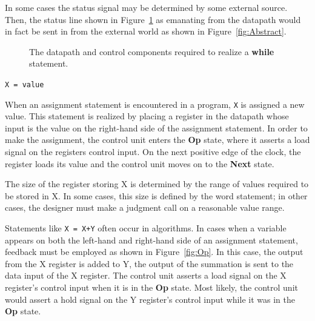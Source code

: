 \begin{description}
In some cases the status signal may be determined by some external 
source.  Then, the status line shown in Figure~\ref{fig:While} 
as emanating from the datapath would in fact be sent in from the 
external world as shown in Figure~\ref{fig:Abstract}.

\begin{figure}[ht]
\caption{The datapath and control components required to realize
a {\bf while} statement.}
\label{fig:While}
\end{figure}

\item[]\verb^X = value^

When an assignment statement is encountered in a program, 
\verb^X^ is assigned a new value.  This statement is realized by 
placing a register in the datapath whose input is the 
value on the right-hand side of the assignment statement.  
In order to make the assignment, the control unit
enters the {\bf Op} state, where it asserts a load signal on the
registers control input.  On the next positive edge of the 
clock, the register loads its value and the control unit
moves on to the {\bf Next} state.

The size of the register storing X is determined by the range
of values  required to be stored in X.  In some
cases, this size is defined by the word statement; in 
other cases, the designer must make a judgment call on a reasonable
value range.

Statements like \verb^X = X+Y^ often occur in 
algorithms.  In cases when a variable appears on both the left-hand
and right-hand side of an assignment statement, feedback must
be employed as shown in Figure~\ref{fig:Op}.  In this case, the 
output from the X register is added to Y, the output of the summation
is sent to the data input of the X register.  The control unit
asserts a load signal on the X register's control input when
it is in the {\bf Op} state.  Most likely, the control unit would assert
a hold signal on the Y register's control input while it
was in the {\bf Op} state.


\end{description}
